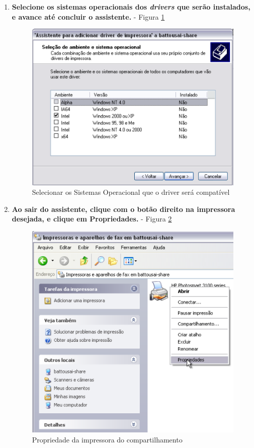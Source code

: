\begin{enumerate}
	
	\item \textbf{Selecione os sistemas operacionais dos \textit{drivers} que serão instalados, e avance até concluir o assistente.} - Figura \ref{selecionar_so}
	\begin{figure}[ht]
	   	\centering
	     \includegraphics[width=0.7 \textwidth]{figuras/selecionar_so}
	   	\caption{Selecionar os Sistemas Operacional que o driver será compatível}
	    \label{selecionar_so}
	\end{figure}
	
	\pagebreak
	
	\item \textbf{Ao sair do assistente, clique com o botão direito na impressora desejada, e clique em Propriedades.} - Figura \ref{propriedade_impressora}
	\begin{figure}[ht]
	   	\centering
	     \includegraphics[width=0.7 \textwidth]{figuras/propriedade_impressora}
	   	\caption{Propriedade da impressora do compartilhamento}
	    \label{propriedade_impressora}
	\end{figure}


\end{enumerate}
